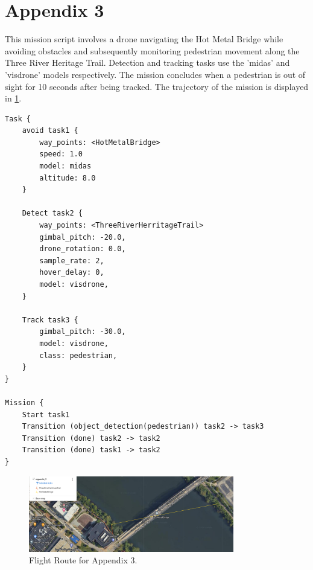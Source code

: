 \section{Appendix 3}
This mission script involves a drone navigating the Hot Metal Bridge while avoiding obstacles and subsequently monitoring pedestrian movement along the Three River Heritage Trail. Detection and tracking tasks use the 'midas' and 'visdrone' models respectively. The mission concludes when a pedestrian is out of sight for 10 seconds after being tracked. The trajectory of the mission is displayed in \ref{fig:appendix_2}.
\begin{lstlisting}[style=customgo]
Task {
    avoid task1 {
        way_points: <HotMetalBridge>
        speed: 1.0
        model: midas
        altitude: 8.0
    }

    Detect task2 {
        way_points: <ThreeRiverHerritageTrail>
        gimbal_pitch: -20.0,
        drone_rotation: 0.0,
        sample_rate: 2,
        hover_delay: 0,
        model: visdrone,
    }

    Track task3 {
        gimbal_pitch: -30.0,
        model: visdrone,
        class: pedestrian,
    }
}

Mission {
    Start task1
    Transition (object_detection(pedestrian)) task2 -> task3
    Transition (done) task2 -> task2
    Transition (done) task1 -> task2
}
\end{lstlisting}

\begin{figure}[H]
    \centering
    \includegraphics[width=0.8\textwidth]{Pictures/thesis_appendix_3.png}
    \caption{Flight Route for Appendix 3.}
    \label{fig:appendix_2}
\end{figure}